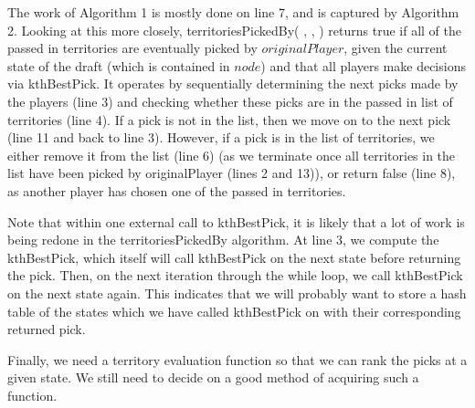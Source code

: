\documentclass[12pt]{article}  %
\begin{document}
The work of Algorithm 1 is mostly done on line 7, and is captured by Algorithm 2.  Looking at this more closely, territoriesPickedBy( , , ) returns true if all of the passed in territories are eventually picked by $originalPlayer$, given the current state of the draft (which is contained in $node$) and that all players make decisions via kthBestPick.  It operates by sequentially determining the next picks made by the players (line 3) and checking whether these picks are in the passed in list of territories (line 4).  If a pick is not in the list, then we move on to the next pick (line 11 and back to line 3).  However, if a pick is in the list of territories, we either remove it from the list (line 6) (as we terminate once all territories in the list have been picked by originalPlayer (lines 2 and 13)), or return false (line 8), as another player has chosen one of the passed in territories.

Note that within one external call to kthBestPick, it is likely that a lot of work is being redone in the territoriesPickedBy algorithm.  At line 3, we compute the kthBestPick, which itself will call kthBestPick on the next state before returning the pick.  Then, on the next iteration through the while loop, we call kthBestPick on the next state again.  This indicates that we will probably want to store a hash table of the states which we have called kthBestPick on with their corresponding returned pick.

Finally, we need a territory evaluation function so that we can rank the picks at a given state.  We still need to decide on a good method of acquiring such a function.
\end{document}
